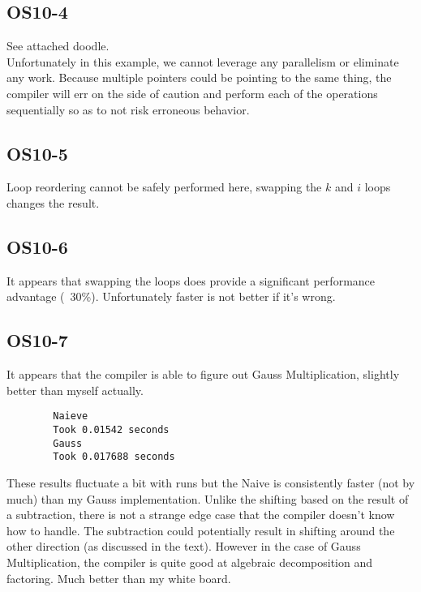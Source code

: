 \documentclass[12pt]{article}
\begin{document}
\begin{flushleft}
		\subsection*{OS10-4}
		See attached doodle.\\
		
		Unfortunately in this example, we cannot leverage any parallelism or eliminate any work. Because multiple pointers could be pointing to the same thing, the compiler will err on the side of caution and perform each of the operations sequentially so as to not risk erroneous behavior.\\
		
		\subsection*{OS10-5}
		Loop reordering cannot be safely performed here, swapping the $k$ and $i$ loops changes the result.\\
		
		\subsection*{OS10-6}
		It appears that swapping the loops does provide a significant performance advantage (~30\%). Unfortunately faster is not better if it's wrong.\\
		
		\subsection*{OS10-7}
		It appears that the compiler is able to figure out Gauss Multiplication, slightly better than myself actually.\\
		\begin{lstlisting}
		Naieve
		Took 0.01542 seconds
		Gauss
		Took 0.017688 seconds
		\end{lstlisting}
		These results fluctuate a bit with runs but the Naive is consistently faster (not by much) than my Gauss implementation. Unlike the shifting based on the result of a subtraction, there is not a strange edge case that the compiler doesn't know how to handle. The subtraction could potentially result in shifting around the other direction (as discussed in the text). However in the case of Gauss Multiplication, the compiler is quite good at algebraic decomposition and factoring. Much better than my white board.\\ 

	\end{flushleft}
\end{document}
